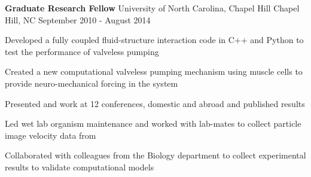\begin{cventries}
  \cventry
    {\textbf{Graduate Research Fellow}} %
    {University of North Carolina, Chapel Hill} %
    {Chapel Hill, NC} %
    {September 2010 - August 2014} %
    {
      \begin{cvitems} %
        \item {Developed a fully coupled fluid-structure interaction code in C++ and Python to test the performance of valveless pumping}
		\item {Created a new computational valveless pumping mechanism using muscle cells to provide neuro-mechanical forcing in the system}
		\item {Presented and work at 12 conferences, domestic and abroad and published results}
    \item {Led wet lab organism maintenance and worked with lab-mates to collect particle image velocity data from}
      \item {Collaborated with colleagues from the Biology department to collect experimental results to validate computational models}
      \end{cvitems}
    }

\end{cventries}
